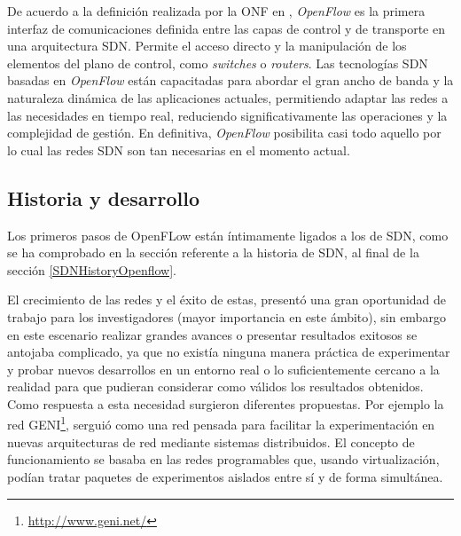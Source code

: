 \documentclass[a4paper,11pt]{book}
\begin{document}
De acuerdo a la definición realizada por la \ac{ONF} en \cite{openflowDefinition}, \emph{OpenFlow} es la primera interfaz de comunicaciones definida entre las capas de control y de transporte en una arquitectura \ac{SDN}. Permite el acceso directo y la manipulación de los elementos del plano de control, como \textit{switches} o \textit{routers}. Las tecnologías \ac{SDN} basadas en \emph{OpenFlow} están capacitadas para abordar el gran ancho de banda y la naturaleza dinámica de las aplicaciones actuales, permitiendo adaptar las redes a las necesidades en tiempo real, reduciendo significativamente las operaciones y la complejidad de gestión. En definitiva, \emph{OpenFlow} posibilita casi todo aquello por lo cual las redes \ac{SDN} son tan necesarias en el momento actual.

\subsection{Historia y desarrollo}

Los primeros pasos de OpenFLow están íntimamente ligados a los de \ac{SDN}, como se ha comprobado en la sección referente a la historia de \ac{SDN}, al final de la sección \ref{SDNHistoryOpenflow}. 

El crecimiento de las redes y el éxito de estas, presentó una gran oportunidad de trabajo para los investigadores (mayor importancia en este ámbito), sin embargo en este escenario realizar grandes avances o presentar resultados exitosos se antojaba complicado, ya que no existía ninguna manera práctica de experimentar y probar nuevos desarrollos en un entorno real o lo suficientemente cercano a la realidad para que pudieran considerar como válidos los resultados obtenidos. Como respuesta a esta necesidad surgieron diferentes propuestas. Por ejemplo la red \ac{GENI}\footnote{\url{http://www.geni.net/}}, serguió como una red pensada para facilitar la experimentación en nuevas arquitecturas de red mediante sistemas distribuidos. El concepto de funcionamiento se basaba en las redes programables que, usando virtualización, podían tratar paquetes de experimentos aislados entre sí y de forma simultánea.
\end{document}
